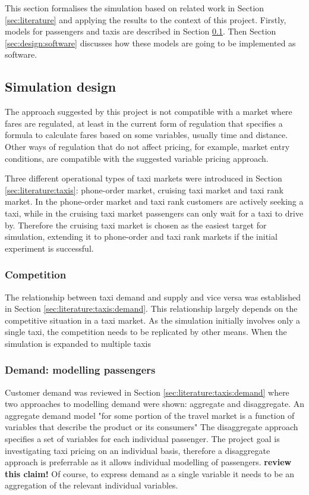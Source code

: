 This section formalises the simulation based on related work in Section
\ref{sec:literature} and applying the results to the context of this project.
Firstly, models for passengers and taxis are described in Section
\ref{sec:design:simulation}. Then Section \ref{sec:design:software} discusses
how these models are going to be implemented as software.

\subsection{Simulation design}
\label{sec:design:simulation}

The approach suggested by this project is not compatible with a market where
fares are regulated, at least in the current form of regulation that specifies
a formula to calculate fares based on some variables, usually time and
distance. Other ways of regulation that do not affect pricing, for example,
market entry conditions, are compatible with the suggested variable pricing
approach.

Three different operational types of taxi markets were introduced in Section
\ref{sec:literature:taxis}: phone-order market, cruising taxi market and taxi
rank market. In the phone-order market and taxi rank customers are actively
seeking a taxi, while in the cruising taxi market passengers can only wait for
a taxi to drive by. Therefore the cruising taxi market is chosen as the easiest
target for simulation, extending it to phone-order and taxi rank markets if the
initial experiment is successful.


\subsubsection{Competition}

The relationship between taxi demand and supply and vice versa was established
in Section \ref{sec:literature:taxis:demand}. This relationship largely depends
on the competitive situation in a taxi market. As the simulation initially
involves only a single taxi, the competition needs to be replicated by other
means. When the simulation is expanded to multiple taxis

\subsubsection{Demand: modelling passengers} 

Customer demand was reviewed in Section \ref{sec:literature:taxis:demand} where
two approaches to modelling demand were shown: aggregate and disaggregate. An
aggregate demand model "for some portion of the travel market is a function of
variables that describe the product or its consumers"
\parencite{Small2007taxi+urban} The disaggregate approach specifies a set of
variables for each individual passenger. The project goal is investigating taxi
pricing on an individual basis, therefore a disaggregate approach is
preferrable as it allows individual modelling of passengers. \textbf{review
this claim!} Of course, to express demand as a single variable it needs to be
an aggregation of the relevant individual variables.

